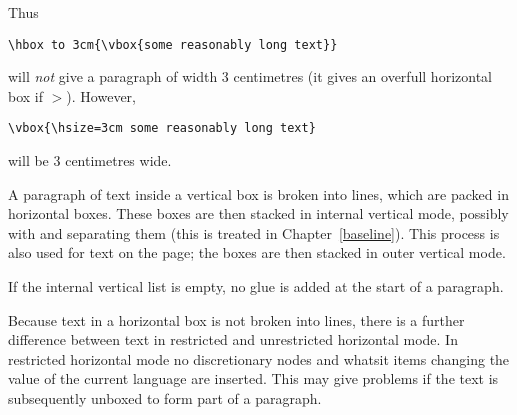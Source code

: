 \documentclass{book}
\begin{document}
Thus
\begin{verbatim}
\hbox to 3cm{\vbox{some reasonably long text}}
\end{verbatim}
will {\sl not\/} give a paragraph of width 3 centimetres
(it gives an overfull horizontal box if ${}>{}$\n{3cm}).
However,
\begin{verbatim}
\vbox{\hsize=3cm some reasonably long text}
\end{verbatim}
will be 3 centimetres wide.

A paragraph of text inside a vertical box is broken into
lines, which are packed in horizontal boxes.
These boxes  are then stacked
in internal vertical mode, possibly with
 and  separating them
(this is treated in Chapter~\ref{baseline}).
This process is also used for text on the page; the boxes
are then stacked in outer vertical mode.

If the internal vertical list is empty, no 
glue is added at the start of a paragraph.

Because text in a horizontal box is not
\label{wide:vbox}%
broken into lines, there is a further
difference between text in restricted and unrestricted
horizontal mode. In restricted horizontal mode no
discretionary nodes and whatsit items changing the
value of the current language are inserted.
This may give problems if the text is subsequently
unboxed to form part of a paragraph.
\end{document}
